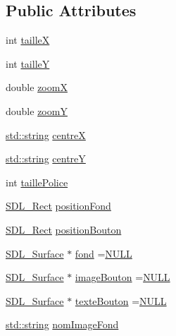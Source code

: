 \subsection*{Public Attributes}
\begin{DoxyCompactItemize}
\item 
int \hyperlink{class_bouton_a4c73aa4a6e96eaae8a1d3a63c8dac983}{taille\+X}
\item 
int \hyperlink{class_bouton_a9f5d708b5c06847453b088e788538665}{taille\+Y}
\item 
double \hyperlink{class_bouton_ad2f8b0abcd023cbca599bca0af297192}{zoom\+X}
\item 
double \hyperlink{class_bouton_a47c6955b1d8b9e75b1c0ef72ef2a585f}{zoom\+Y}
\item 
\hyperlink{_s_d_l__opengl_8h_ae9ea2d206f76ea82db7a2ea002fdef2f}{std\+::string} \hyperlink{class_bouton_a01ce5478093e65e588cce2dbf94333cc}{centre\+X}
\item 
\hyperlink{_s_d_l__opengl_8h_ae9ea2d206f76ea82db7a2ea002fdef2f}{std\+::string} \hyperlink{class_bouton_ae511256fd074ca6df053b4700ab02101}{centre\+Y}
\item 
int \hyperlink{class_bouton_a5e552b3de0165eb901e0c0d5e44d3efe}{taille\+Police}
\item 
\hyperlink{struct_s_d_l___rect}{S\+D\+L\+\_\+\+Rect} \hyperlink{class_bouton_af3cd11a5cba70dc2f12c0d993e7e06c1}{position\+Fond}
\item 
\hyperlink{struct_s_d_l___rect}{S\+D\+L\+\_\+\+Rect} \hyperlink{class_bouton_a0f5cf4db7a478cd25d6939585a38b1ec}{position\+Bouton}
\item 
\hyperlink{struct_s_d_l___surface}{S\+D\+L\+\_\+\+Surface} $\ast$ \hyperlink{class_bouton_aa53b44d614e81eea3e1d93ac95099475}{fond} =\hyperlink{begin__code_8h_a070d2ce7b6bb7e5c05602aa8c308d0c4}{N\+U\+L\+L}
\item 
\hyperlink{struct_s_d_l___surface}{S\+D\+L\+\_\+\+Surface} $\ast$ \hyperlink{class_bouton_a500913a4699d8a5e650861552efd1365}{image\+Bouton} =\hyperlink{begin__code_8h_a070d2ce7b6bb7e5c05602aa8c308d0c4}{N\+U\+L\+L}
\item 
\hyperlink{struct_s_d_l___surface}{S\+D\+L\+\_\+\+Surface} $\ast$ \hyperlink{class_bouton_a71cfadd4002fcb9f21feeea2ace385be}{texte\+Bouton} =\hyperlink{begin__code_8h_a070d2ce7b6bb7e5c05602aa8c308d0c4}{N\+U\+L\+L}
\item 
\hyperlink{_s_d_l__opengl_8h_ae9ea2d206f76ea82db7a2ea002fdef2f}{std\+::string} \hyperlink{class_bouton_acc4ce08bca16c13c7f221b6f477b3939}{nom\+Image\+Fond}
\item 

\end{DoxyCompactItemize}
